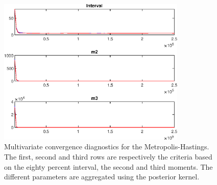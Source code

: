  
\begin{figure}[H]
\centering 
\includegraphics[width=0.8\textwidth]{BRS_fd/Output/BRS_fd_mdiag}
\caption{Multivariate convergence diagnostics for the Metropolis-Hastings.
The first, second and third rows are respectively the criteria based on
the eighty percent interval, the second and third moments. The different 
parameters are aggregated using the posterior kernel.}\label{Fig:MultivariateDiagnostics}
\end{figure}


